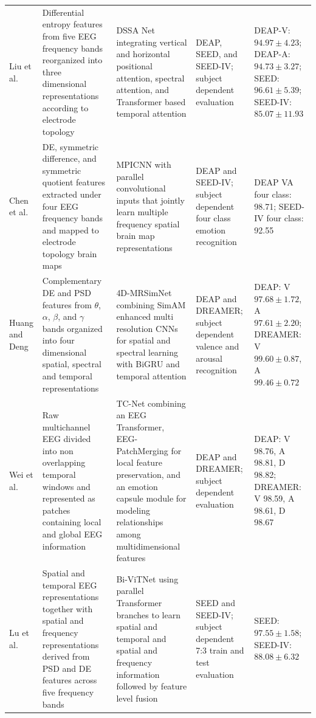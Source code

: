 \documentclass[ASNA,twocolumn]{USG}
\newcommand{\lightrowsep}{%
  \arrayrulecolor{lightrowgray}%
  \specialrule{0.30pt}{3.5pt}{3.5pt}%
  \arrayrulecolor{black}%
}
\begin{document}
\begin{table}
\begin{tabularx}{\textheight}{
>{\raggedright\arraybackslash}p{3.15cm}
>{\raggedright\arraybackslash}X
>{\raggedright\arraybackslash}X
>{\raggedright\arraybackslash}p{3.65cm}
>{\raggedright\arraybackslash}p{5.15cm}}
\lightrowsep

Liu et al. \cite{liu2025directional} &
Differential entropy features from five EEG frequency bands reorganized
into three dimensional representations according to electrode topology &
DSSA Net integrating vertical and horizontal positional attention,
spectral attention, and Transformer based temporal attention &
DEAP, SEED, and SEED-IV; subject dependent evaluation &
DEAP-V: $94.97 \pm 4.23$;
DEAP-A: $94.73 \pm 3.27$;
SEED: $96.61 \pm 5.39$;
SEED-IV: $85.07 \pm 11.93$ \\

\lightrowsep

Chen et al. \cite{chen2025eeg} &
DE, symmetric difference, and symmetric quotient features extracted
under four EEG frequency bands and mapped to electrode topology brain maps &
MPICNN with parallel convolutional inputs that jointly learn
multiple frequency spatial brain map representations &
DEAP and SEED-IV; subject dependent four class emotion recognition &
DEAP VA four class: 98.71;
SEED-IV four class: 92.55 \\

\lightrowsep

Huang and Deng \cite{huang2025simam} &
Complementary DE and PSD features from $\theta$, $\alpha$, $\beta$, and $\gamma$
bands organized into four dimensional spatial, spectral and temporal representations &
4D-MRSimNet combining SimAM enhanced multi resolution CNNs
for spatial and spectral learning with BiGRU and temporal attention &
DEAP and DREAMER; subject dependent valence and arousal recognition &
DEAP: V $97.68 \pm 1.72$, A $97.61 \pm 2.20$;
DREAMER: V $99.60 \pm 0.87$, A $99.46 \pm 0.72$ \\

\lightrowsep

Wei et al. \cite{wei2023tc} &
Raw multichannel EEG divided into non overlapping temporal windows
and represented as patches containing local and global EEG information &
TC-Net combining an EEG Transformer,
EEG-PatchMerging for local feature preservation,
and an emotion capsule module for modeling relationships
among multidimensional features &
DEAP and DREAMER; subject dependent evaluation &
DEAP: V 98.76, A 98.81, D 98.82;
DREAMER: V 98.59, A 98.61, D 98.67 \\

\lightrowsep

Lu et al. \cite{lu2023bi} &
Spatial and temporal EEG representations together with spatial and frequency
representations derived from PSD and DE features across five frequency bands &
Bi-ViTNet using parallel Transformer branches to learn spatial and temporal
and spatial and frequency information followed by feature level fusion &
SEED and SEED-IV; subject dependent 7:3 train and test evaluation &
SEED: $97.55 \pm 1.58$;
SEED-IV: $88.08 \pm 6.32$ \\


\end{tabularx}
\end{table}
\end{document}
